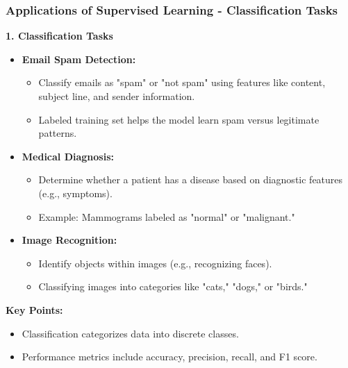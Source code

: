 \documentclass[aspectratio=169]{beamer}
\begin{document}
\begin{frame}[fragile]
    \frametitle{Applications of Supervised Learning - Classification Tasks}
    \textbf{1. Classification Tasks} 
    \begin{itemize}
        \item \textbf{Email Spam Detection:} 
        \begin{itemize}
            \item Classify emails as "spam" or "not spam" using features like content, subject line, and sender information.
            \item Labeled training set helps the model learn spam versus legitimate patterns.
        \end{itemize}
        
        \item \textbf{Medical Diagnosis:}
        \begin{itemize}
            \item Determine whether a patient has a disease based on diagnostic features (e.g., symptoms).
            \item Example: Mammograms labeled as "normal" or "malignant."
        \end{itemize}

        \item \textbf{Image Recognition:}
        \begin{itemize}
            \item Identify objects within images (e.g., recognizing faces).
            \item Classifying images into categories like "cats," "dogs," or "birds."
        \end{itemize}
    \end{itemize}
    
    \textbf{Key Points:}
    \begin{itemize}
        \item Classification categorizes data into discrete classes.
        \item Performance metrics include accuracy, precision, recall, and F1 score.
    \end{itemize}
\end{frame}
\end{document}
